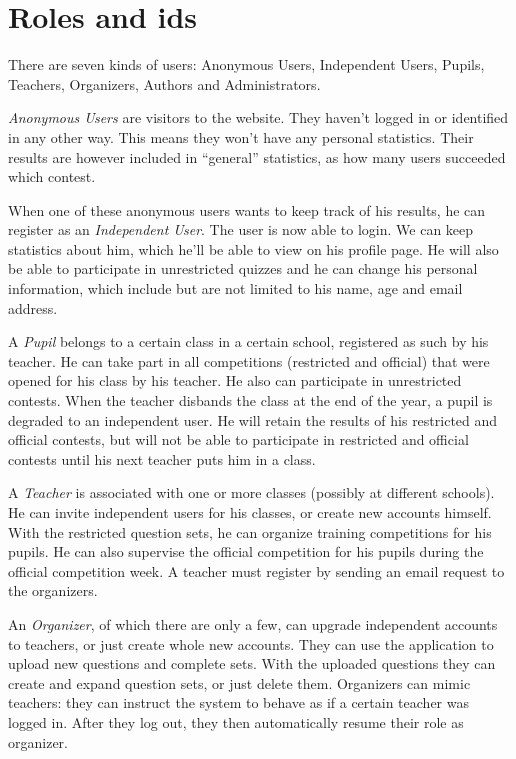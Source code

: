 \section{Roles and ids}

There are seven kinds of users: Anonymous Users, Independent Users, Pupils,
Teachers, Organizers, Authors and Administrators.

\textit{Anonymous Users} are visitors to the website. They haven't logged in or
identified in any other way. This means they won't have any personal
statistics. Their results are however included in ``general'' statistics, as
how many users succeeded which contest.

When one of these anonymous users wants to keep track of his results, he can
register as an \textit{Independent User}. The user is now able to login. We can
keep statistics about him, which he'll be able to view on his profile page.  
He will also be able to participate in unrestricted quizzes and he
can change his personal information, which include but are not limited to his
name, age and email address.

A \textit{Pupil} belongs to a certain class in a certain school, registered
as such by his teacher. He can take part in all competitions (restricted and
official) that were opened for his class by his teacher. He also can participate
in unrestricted contests. When the teacher disbands the class at the end of the
year, a pupil is degraded to an independent user. He will retain the results of
his restricted and official contests, but will not be able to participate in
restricted and official contests until his next teacher puts him in a class.

A \textit{Teacher} is associated with one or more classes (possibly at
different schools). He can invite independent users for his classes, or create
new accounts himself. With the restricted question sets, he can organize
training competitions for his pupils. He can also supervise the official
competition for his pupils during the official competition week. A teacher
must register by sending an email request to the organizers.

An \textit{Organizer}, of which there are only a few, can upgrade independent
accounts to teachers, or just create whole new accounts. They can use the
application to upload new questions and complete sets. With the uploaded
questions they can create and expand question sets, or just delete them.
Organizers can mimic teachers: they can instruct the system to behave as if a
certain teacher was logged in. After they log out, they then automatically
resume their role as organizer.

